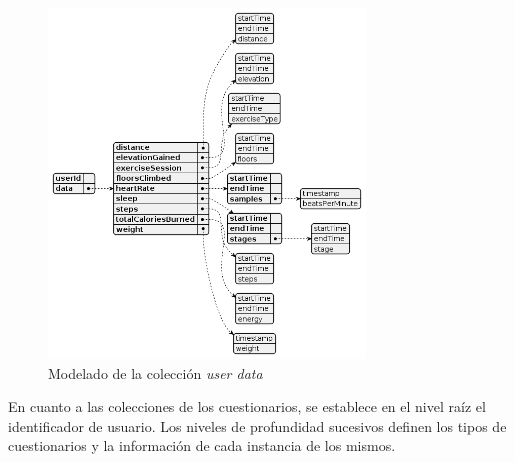             \begin{figure}[h]
                \centering
                \includegraphics[width=0.75\textwidth]{figures/bd/Servidor user data.png}
                \caption{Modelado de la colección \textit{user data}}
                \label{figure:disenio:diagrama_user_data}
            \end{figure}

            En cuanto a las colecciones de los cuestionarios, se establece en el nivel raíz el identificador de usuario. Los niveles de profundidad sucesivos definen los tipos de cuestionarios y la información de cada instancia de los mismos.
    
